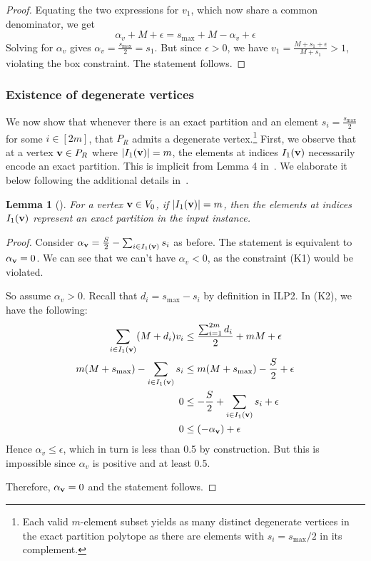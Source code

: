 \documentclass[3p, twocolumn]{elsarticle}
\newtheorem{lemma}[theorem]{Lemma}
\def\ve#1{\mathchoice{\mbox{\boldmath$\displaystyle\bf#1$}}
{\mbox{\boldmath$\textstyle\bf#1$}}
{\mbox{\boldmath$\scriptstyle\bf#1$}}
{\mbox{\boldmath$\scriptscriptstyle\bf#1$}}}
\begin{document}
\begin{proof}
Equating the two expressions for $v_1$, which now share a common denominator, we get 
$$ \alpha_v + M + \epsilon = s_{\max} + M - \alpha_v +\epsilon$$
Solving for $\alpha_v$ gives $\alpha_v = \displaystyle \frac{s_{\max}}{2} = s_1$.  But since $\epsilon>0$, we have $v_1 = \displaystyle \frac{M + s_1 + \epsilon}{M+s_1} > 1$, violating the box constraint.  The statement follows.



\end{proof}

\subsubsection{Existence of degenerate vertices}
We now show that whenever there is an exact partition and an element $s_i = \frac{s_{\max}}{2}$ for some $i \in [2m]$, that $P_R$ admits a degenerate vertex.\footnote{Each valid $m$-element subset yields as many distinct degenerate vertices in the exact partition polytope as there are elements with $s_i = s_{\max} /2$ in its complement.} 
First, we observe that at a vertex $\ve{v} \in P_R$ where $|I_1(\ve{v})|=m$, the elements at indices $I_1(\ve{v})$ necessarily encode an exact partition. This is implicit from Lemma 4 in~\cite{FT94}.  We elaborate it below following the additional details in~\cite{KN25}. 

\begin{lemma}[\cite{KN25}]\label{epv}
For a vertex $\ve{v}\in V_0$, if $|I_1(\ve{v})|=m$, then the elements at indices $I_1(\ve{v})$ represent an exact partition in the input instance.
\end{lemma} 

\begin{proof}
    

Consider $\alpha_{\ve{v}} = \frac{S}{2} - \sum_{i \in I_1(\ve{v})}s_i$ as before. The statement is equivalent to $\alpha_{\ve{v}} = 0$. 
We can see that we can't have $\alpha_v < 0$, as the constraint (K1) would be violated.

So assume $\alpha_v >0$.
Recall that $d_i = s_{\max}-s_i$ by definition in ILP2. In (K2), we have the following:
        \begin{align*}
            \sum_{i \in I_1(\ve{v})} (M+d_i)v_i &\leq 
               \frac{\sum_{i=1}^{2m} d_i}{2} + mM + \epsilon\\
            m(M + s_{\max}) - \sum_{i \in I_1(\ve{v})}s_i &\leq m(M+s_{\max}) - \frac{S}{2} + \epsilon \\
            0 &\leq -\frac{S}{2} + \sum_{i \in I_1(\ve{v})}s_i + \epsilon\\
            0 &\leq (-\alpha_{\ve{v}}) + \epsilon
         \end{align*}
     Hence $\alpha_v \le \epsilon$, which in turn is less than 0.5 by construction.     But this is impossible since $\alpha_v$ is positive and at least 0.5.
    
    Therefore, $\alpha_{\ve{v}} = 0$ and the statement follows. 
    
\end{proof}
\end{document}
